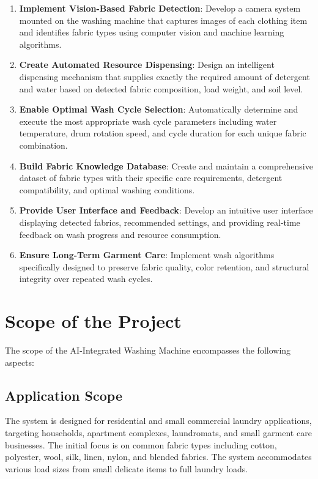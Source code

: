 \begin{enumerate}
    \item \textbf{Implement Vision-Based Fabric Detection}: Develop a camera system mounted on the washing machine that captures images of each clothing item and identifies fabric types using computer vision and machine learning algorithms.
    \item \textbf{Create Automated Resource Dispensing}: Design an intelligent dispensing mechanism that supplies exactly the required amount of detergent and water based on detected fabric composition, load weight, and soil level.
    \item \textbf{Enable Optimal Wash Cycle Selection}: Automatically determine and execute the most appropriate wash cycle parameters including water temperature, drum rotation speed, and cycle duration for each unique fabric combination.
    \item \textbf{Build Fabric Knowledge Database}: Create and maintain a comprehensive dataset of fabric types with their specific care requirements, detergent compatibility, and optimal washing conditions.
    \item \textbf{Provide User Interface and Feedback}: Develop an intuitive user interface displaying detected fabrics, recommended settings, and providing real-time feedback on wash progress and resource consumption.
    \item \textbf{Ensure Long-Term Garment Care}: Implement wash algorithms specifically designed to preserve fabric quality, color retention, and structural integrity over repeated wash cycles.
\end{enumerate}

\section{Scope of the Project}
The scope of the AI-Integrated Washing Machine encompasses the following aspects:

\subsection{Application Scope}
The system is designed for residential and small commercial laundry applications, targeting households, apartment complexes, laundromats, and small garment care businesses. The initial focus is on common fabric types including cotton, polyester, wool, silk, linen, nylon, and blended fabrics. The system accommodates various load sizes from small delicate items to full laundry loads.

